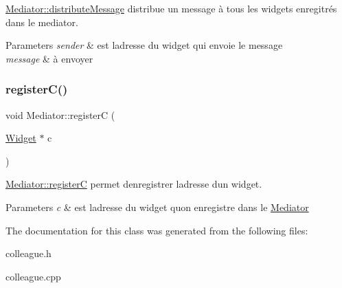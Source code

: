 \hyperlink{classMediator_a6d85bc8652e2fbd4f37b7ba67559c9e3}{Mediator\+::distribute\+Message} distribue un message à tous les widgets enregitrés dans le mediator. 


\begin{DoxyParams}{Parameters}
{\em sender} & est l\textquotesingle{}adresse du widget qui envoie le message \\
\hline
{\em message} & à envoyer \\
\hline
\end{DoxyParams}
\mbox{\label{classMediator_aeb991fe5844fcb6ccd40086369373e37}} 
\subsubsection{\texorpdfstring{register\+C()}{registerC()}}
{\footnotesize\ttfamily void Mediator\+::registerC (\begin{DoxyParamCaption}\item[{\hyperlink{classWidget}{Widget} $\ast$}]{c }\end{DoxyParamCaption})\hspace{0.3cm}{\ttfamily [virtual]}}



\hyperlink{classMediator_aeb991fe5844fcb6ccd40086369373e37}{Mediator\+::registerC} permet d\textquotesingle{}enregistrer l\textquotesingle{}adresse d\textquotesingle{}un widget. 


\begin{DoxyParams}{Parameters}
{\em c} & est l\textquotesingle{}adresse du widget qu\textquotesingle{}on enregistre dans le \hyperlink{classMediator}{Mediator} \\
\hline
\end{DoxyParams}


The documentation for this class was generated from the following files\+:\begin{DoxyCompactItemize}
\item 
colleague.\+h\item 
colleague.\+cpp\end{DoxyCompactItemize}
